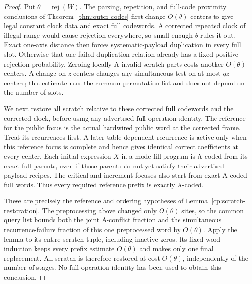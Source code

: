 \begin{proof}
Put $\theta=\operatorname{rej}(W)$. The parsing, repetition, and full-code
proximity conclusions of Theorem~\ref{thm:outer-codes} first change
$O(\theta)$ centers to give legal constant clock data and exact full
codewords. A corrected repeated clock of illegal range would cause
rejection everywhere, so small enough $\theta$ rules it out. Exact
one-axis distance then forces systematic-payload duplication in every
full slot. Otherwise that one failed duplication relation already has a
fixed positive rejection probability. Zeroing locally A-invalid scratch
parts costs another $O(\theta)$ centers. A change on $z$ centers changes
any simultaneous test on at most $qz$ centers; this estimate uses the
common permutation list and does not depend on the number of slots.

We next restore all scratch relative to these corrected full codewords
and the corrected clock, before using any advertised full-operation
identity. The reference for the public focus is the actual hardwired
public word at the corrected frame. Treat its recurrences first. A later
table-dependent recurrence is active only when this reference focus is
complete and hence gives identical correct coefficients at every center.
Each initial expression $X$ in a mode-fill program is A-coded from its
exact full parents, even if those parents do not yet satisfy their
advertised payload recipes. The critical and increment focuses also
start from exact A-coded full words. Thus every required reference
prefix is exactly A-coded.

These are precisely the reference and ordering hypotheses of
Lemma~\ref{op:scratch-restoration}. The preprocessing above changed only
$O(\theta)$ sites, so the common query list bounds both the joint
A-conflict fraction and the simultaneous recurrence-failure fraction of
this one preprocessed word by $O(\theta)$. Apply the lemma to its entire
scratch tuple, including inactive zeros. Its fixed-word induction keeps
every prefix estimate $O(\theta)$ and makes only one final replacement.
All scratch is therefore restored at cost $O(\theta)$, independently of
the number of stages. No full-operation identity has been used to obtain
this conclusion.


\end{proof}
